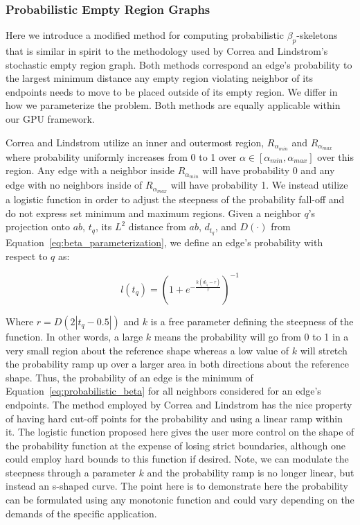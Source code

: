 \subsubsection{Probabilistic Empty Region Graphs}

Here we introduce a modified method for computing probabilistic $\beta_p$-skeletons that is similar in spirit to the methodology used by Correa and Lindstrom's stochastic empty region graph.
%
Both methods correspond an edge's probability to the largest minimum distance any empty region violating neighbor of its endpoints needs to move to be placed outside of its empty region.
%
We differ in how we parameterize the problem.
%
Both methods are equally applicable within our GPU framework.

Correa and Lindstrom utilize an inner and outermost region, $R_{\alpha_{min}}$ and $R_{\alpha_{max}}$ where probability uniformly increases from 0 to 1 over $\alpha \in [\alpha_{min},\alpha_{max}]$ over this region.
%
Any edge with a neighbor inside $R_{\alpha_{min}}$ will have probability 0 and any edge with no neighbors inside of $R_{\alpha_{max}}$ will have probability 1.
%
We instead utilize a logistic function in order to adjust the steepness of the probability fall-off and do not express set minimum and maximum regions.
%
Given a neighbor $q$'s projection onto $ab$, $t_q$, its $L^2$ distance from $ab$, $d_{t_q}$, and $D(\cdot)$ from Equation~\ref{eq:beta_parameterization}, we define an edge's probability with respect to $q$ as:

\begin{equation}
\label{eq:probabilistic_beta}
    l(t_q) = \left(1 + e^{-\frac{k\left(d_{t_q}-r\right)}{r}}\right)^{-1}
\end{equation}

Where $r = D(2|t_q - 0.5|)$ and $k$ is a free parameter defining the steepness of the function.
%
In other words, a large $k$ means the probability will go from 0 to 1 in a very small region about the reference shape whereas a low value of $k$ will stretch the probability ramp up over a larger area in both directions about the reference shape.
%
Thus, the probability of an edge is the minimum of Equation~\ref{eq:probabilistic_beta} for all neighbors considered for an edge's endpoints.
%
The method employed by Correa and Lindstrom has the nice property of having hard cut-off points for the probability and using a linear ramp within it.
%
The logistic function proposed here gives the user more control on the shape of the probability function at the expense of losing strict boundaries, although one could employ hard bounds to this function if desired.
%
Note, we can modulate the steepness through a parameter $k$ and the probability ramp is no longer linear, but instead an s-shaped curve.
%
The point here is to demonstrate here the probability can be formulated using any monotonic function and could vary depending on the demands of the specific application.

